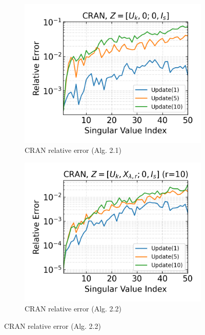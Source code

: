 \begin{figure}[h]
  \centering
  \begin{subfigure}[b]{0.32\textwidth}
    \centering
    \includegraphics[width=\textwidth]{../openreview/figures/report_figures/CRAN_zha-simon_n_batches_10_k_dims_50_rel_err.png}
    \caption{CRAN relative error (Alg. 2.1)}
  \end{subfigure}
  \hfill
  \begin{subfigure}[b]{0.32\textwidth}
    \centering
    \includegraphics[width=\textwidth]{../openreview/figures/report_figures/CRAN_bcg_n_batches_10_k_dims_50_rval_10_rel_err.png}
    \caption{CRAN relative error (Alg. 2.2)}

\end{subfigure}
\end{figure}
